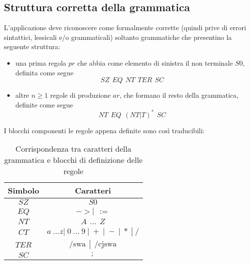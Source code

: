 \documentclass[12pt]{article}
\begin{document}
\subsection{Struttura corretta della grammatica}\label{struttura}
L'applicazione deve riconoscere come formalmente corrette (quindi prive di errori sintattici, lessicali e/o grammaticali) soltanto grammatiche che presentino la seguente struttura:
\begin{itemize}
\item una prima regola $pr$ che abbia come elemento di sinistra il non terminale $S0$, definita come segue
$$
SZ \hspace{5pt} EQ \hspace{5pt} NT \hspace{5pt} TER \hspace{5pt} SC
$$
\item altre $n \geq 1$ regole di produzione $ar$, che formano il resto della grammatica, definite come segue
$$
NT \hspace{5pt} EQ \hspace{5pt} \left( NT \left| T \right. \right)^* \hspace{5pt} SC
$$
\end{itemize}
I blocchi componenti le regole appena definite sono così traducibili:
\begin{table}[h]
\centering
\begin{tabular}{|c|c|}
\hline
\textbf{Simbolo} & \textbf{Caratteri} \\
\hline
$SZ$ & $S0$ \\
\hline
$EQ$ & $-> \left| \hspace{5pt} := \right.$ \\
\hline
$NT$ & $A \hspace{5pt} \dots \hspace{5pt} Z$ \\
\hline
$CT$ & $a \hspace{3pt} \dots z \left| \hspace{3pt} 0 \hspace{3pt} \dots \hspace{3pt} 9 \hspace{3pt} \right| \hspace{3pt} + \hspace{3pt} \left| \hspace{3pt} - \hspace{3pt} \right| \hspace{3pt} * \hspace{3pt} \left| \hspace{3pt} / \right.$ \\
\hline
$TER$ & $\text{/swa} \hspace{5pt} \left| \hspace{5pt} \text{/cjswa} \right.$ \\
\hline
$SC$ & $;$ \\
\hline
\end{tabular}
\caption{Corrispondenza tra caratteri della grammatica e blocchi di definizione delle regole}
\end{table}
\end{document}
